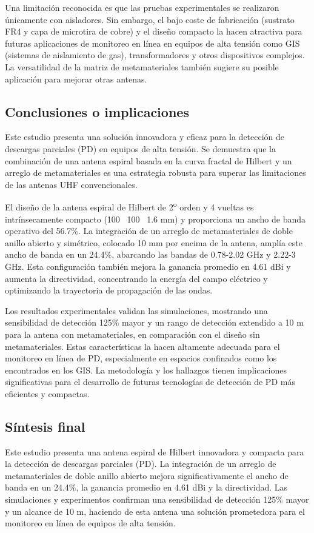 \documentclass[11pt,a4paper]{article}
\begin{document}
Una limitación reconocida es que las pruebas experimentales se realizaron únicamente con aisladores. Sin embargo, el bajo coste de fabricación (sustrato FR4 y capa de microtira de cobre) y el diseño compacto la hacen atractiva para futuras aplicaciones de monitoreo en línea en equipos de alta tensión como GIS (sistemas de aislamiento de gas), transformadores y otros dispositivos complejos. La versatilidad de la matriz de metamateriales también sugiere su posible aplicación para mejorar otras antenas.

\subsection*{Conclusiones o implicaciones}
Este estudio presenta una solución innovadora y eficaz para la detección de descargas parciales (PD) en equipos de alta tensión. Se demuestra que la combinación de una antena espiral basada en la curva fractal de Hilbert y un arreglo de metamateriales es una estrategia robusta para superar las limitaciones de las antenas UHF convencionales.

El diseño de la antena espiral de Hilbert de 2\textsuperscript{o} orden y 4 vueltas es intrínsecamente compacto (100 \texttimes\ 100 \texttimes\ 1.6 mm) y proporciona un ancho de banda operativo del 56.7\%. La integración de un arreglo de metamateriales de doble anillo abierto y simétrico, colocado 10 mm por encima de la antena, amplía este ancho de banda en un 24.4\%, abarcando las bandas de 0.78-2.02 GHz y 2.22-3 GHz. Esta configuración también mejora la ganancia promedio en 4.61 dBi y aumenta la directividad, concentrando la energía del campo eléctrico y optimizando la trayectoria de propagación de las ondas.

Los resultados experimentales validan las simulaciones, mostrando una sensibilidad de detección 125\% mayor y un rango de detección extendido a 10 m para la antena con metamateriales, en comparación con el diseño sin metamateriales. Estas características la hacen altamente adecuada para el monitoreo en línea de PD, especialmente en espacios confinados como los encontrados en los GIS. La metodología y los hallazgos tienen implicaciones significativas para el desarrollo de futuras tecnologías de detección de PD más eficientes y compactas.

\subsection*{Síntesis final}
Este estudio presenta una antena espiral de Hilbert innovadora y compacta para la detección de descargas parciales (PD). La integración de un arreglo de metamateriales de doble anillo abierto mejora significativamente el ancho de banda en un 24.4\%, la ganancia promedio en 4.61 dBi y la directividad. Las simulaciones y experimentos confirman una sensibilidad de detección 125\% mayor y un alcance de 10 m, haciendo de esta antena una solución prometedora para el monitoreo en línea de equipos de alta tensión.
\end{document}
